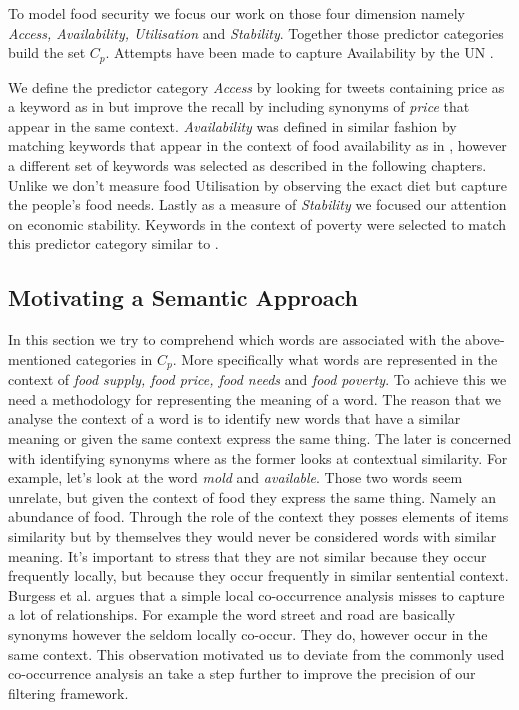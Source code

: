 To model food security we focus our work on those four dimension namely \emph{Access, Availability, Utilisation} and \emph{Stability}. Together those predictor categories build the set $C_p$. Attempts have been made to capture Availability by the UN \cite{ungp2013}. 

We define the predictor category \emph{Access} by looking for tweets containing price as a keyword as in \cite{ungp2013} but improve the recall by including synonyms of \emph{price} that appear in the same context. \emph{Availability} was defined in similar fashion by matching keywords that appear in the context of food availability as in \cite{hum14}, however a different set of keywords was selected as described in the following chapters. Unlike \cite{AbbarMW14} we don't measure food Utilisation by observing the exact diet but capture the people's food needs. Lastly as a measure of \emph{Stability} we focused our attention on economic stability. Keywords in the context of  poverty were selected to match this predictor category similar to \cite{RePEc} \cite{hum14}.

\subsection{Motivating a Semantic Approach}
\label{subsec:hal}

In this section we try to comprehend which words are associated with the above-mentioned categories in $C_p$. More specifically what words are represented in the context of \emph{food supply, food price, food needs} and \emph{food poverty}. To achieve this we need a methodology for representing the meaning of a word. The reason that we analyse the context of a word is to identify new words that have a similar meaning or given the same context express the same thing. The later is concerned with identifying synonyms where as the former looks at contextual similarity. For example, let's look at the word \emph {mold} and \emph {available}. Those two words seem unrelate, but given the context of food they express the same thing.  Namely an abundance of food. Through the role  of the context they posses elements of items similarity but by themselves they would never be considered words with similar meaning. It's important to stress that they are not similar because they occur frequently locally, but because they occur frequently in similar sentential context. Burgess et al. \cite{burgess98} argues that a simple local co-occurrence analysis misses to capture a lot of relationships. For example the word street and road are basically synonyms however the seldom locally co-occur. They do, however occur in the same context. This observation motivated us to deviate from the commonly used co-occurrence analysis an take a step further to improve the precision of our filtering framework. 




